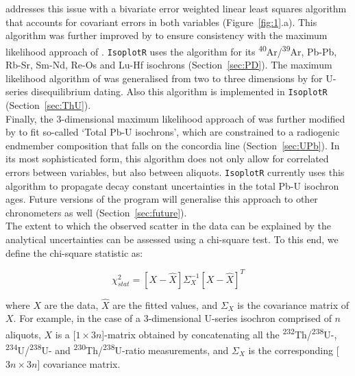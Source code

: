 \documentclass{article}
\begin{document}
\citet{york1969} addresses this issue with a bivariate error weighted
linear least squares algorithm that accounts for covariant errors in
both variables (Figure~\ref{fig:1}.a). This algorithm was further
improved by \citet{york2004} to ensure consistency with the maximum
likelihood approach of \citet{titterington1979}. \texttt{IsoplotR}
uses the \citet{york2004} algorithm for its
\textsuperscript{40}Ar/\textsuperscript{39}Ar, Pb-Pb, Rb-Sr, Sm-Nd,
Re-Os and Lu-Hf isochrons (Section~\ref{sec:PD}). The maximum
likelihood algorithm of \citet{titterington1979} was generalised from
two to three dimensions by \citet{ludwig1994} for U-series
disequilibrium dating.  Also this algorithm is implemented in
\texttt{IsoplotR} (Section~\ref{sec:ThU}).\\

Finally, the 3-dimensional maximum likelihood approach of
\citet{ludwig1994} was further modified by \citet{ludwig1998} to fit
so-called `Total Pb-U isochrons', which are constrained to a
radiogenic endmember composition that falls on the concordia line
(Section~\ref{sec:UPb}). In its most sophisticated form, this
algorithm does not only allow for correlated errors between variables,
but also between aliquots. \texttt{IsoplotR} currently uses this
algorithm to propagate decay constant uncertainties in the total Pb-U
isochron ages. Future versions of the program will generalise this
approach to other chronometers as well (Section~\ref{sec:future}).\\

The extent to which the observed scatter in the data can be explained
by the analytical uncertainties can be assessed using a chi-square
test.  To this end, we define the chi-square statistic as:

\begin{equation}
  \chi_{stat}^2 = \left[X - \hat{X}\right] \Sigma_{X}^{-1} \left[X - \hat{X}\right]^T
  \label{eq:Chi2}
\end{equation}

\noindent where $X$ are the data, $\hat{X}$ are the fitted values, and
$\Sigma_X$ is the covariance matrix of $X$. For example, in the case
of a 3-dimensional U-series isochron comprised of $n$ aliquots, $X$ is
a [$1 \times 3n$]-matrix obtained by concatenating all the
\textsuperscript{232}Th/\textsuperscript{238}U-,
\textsuperscript{234}U/\textsuperscript{238}U- and
\textsuperscript{230}Th/\textsuperscript{238}U-ratio measurements, and
$\Sigma_X$ is the corresponding [$3n \times 3n$] covariance matrix.\\
\end{document}
